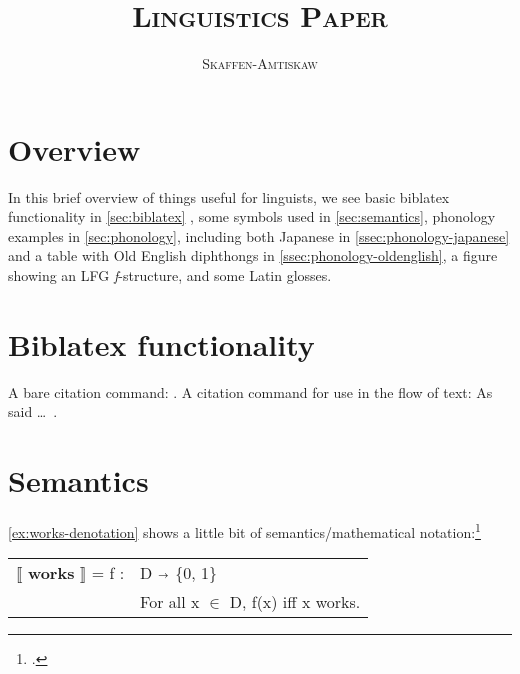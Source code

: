 \documentclass[a4paper,12pt,twoside]{article}
\newcommand{\thistitle}{\textsc{Linguistics Paper}}
\newcommand{\thisauthor}{\textsc{Skaffen-Amtiskaw}}
\begin{document}

\tableofcontents
\thispagestyle{toc}
\newpage

\listoffigures
\thispagestyle{lof}
\newpage

\listoftables
\thispagestyle{lot}
\newpage

\title{\thistitle}
\author{\thisauthor}

\maketitle
\thispagestyle{plain}

\section{Overview}

In this brief overview of things useful for linguists, we see basic biblatex
functionality in \autoref{sec:biblatex} , some symbols used in
\autoref{sec:semantics}, phonology examples in \autoref{sec:phonology},
including both Japanese in \autoref{ssec:phonology-japanese} and a table with
Old English diphthongs in \autoref{ssec:phonology-oldenglish}, a figure showing
an LFG \textit{f}-structure, and some Latin glosses.

\section{Biblatex functionality}\label{sec:biblatex}

A bare citation command: \autocite{burgess-plunkett-2013-1}. A citation command
for use in the flow of text: As \textcite{burgess-plunkett-2013-1} said \dots~.

\section{Semantics}\label{sec:semantics}

\autoref{ex:works-denotation} shows a little bit of semantics/mathematical
notation:\footcite[15]{heim-kratzer-1998}

\begin{exe}
  \ex\label{ex:works-denotation}

  \leavevmode\vadjust{\vspace{-\baselineskip}}

  \begin{tabular}[c]{l l}
    $\llbracket$ \textbf{works} $\rrbracket$ = f : & D $\shortrightarrow$ \{0, 1\} \\
                                                   & For all x $\in$ D, f(x) iff x works.  \\
  \end{tabular}

\end{exe}
\end{document}
